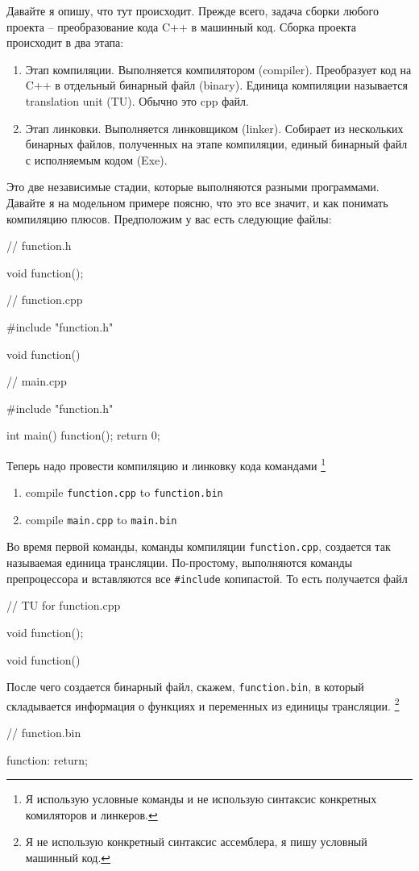 Давайте я опишу, что тут происходит.
Прежде всего, задача сборки любого проекта -- преобразование кода C++ в машинный код.
Сборка проекта происходит в два этапа:
\begin{enumerate}
\item Этап компиляции.
Выполняется компилятором (compiler).
Преобразует код на C++ в отдельный бинарный файл (binary).
Единица компиляции называется translation unit (TU).
Обычно это cpp файл.

\item Этап линковки.
Выполняется линковщиком (linker).
Собирает из нескольких бинарных файлов, полученных на этапе компиляции, единый бинарный файл с исполняемым кодом (Exe).
\end{enumerate}

Это две независимые стадии, которые выполняются разными программами.
Давайте я на модельном примере поясню, что это все значит, и как понимать компиляцию плюсов.
Предположим у вас есть следующие файлы:
\begin{cppcode}
// function.h

void function();

// function.cpp

#include "function.h"

void function() {
}

// main.cpp

#include "function.h"

int main() {
function();
return 0;
}
\end{cppcode}
Теперь надо провести компиляцию и линковку кода командами%
\footnote{Я использую условные команды и не использую синтаксис конкретных комиляторов и линкеров.}
\begin{enumerate}
\item compile \verb"function.cpp" to \verb"function.bin"

\item compile \verb"main.cpp" to \verb"main.bin"
\end{enumerate}
Во время первой команды, команды компиляции \verb"function.cpp", создается так называемая единица трансляции.
По-простому, выполняются команды препроцессора и вставляются все \verb"#include" копипастой.
То есть получается файл
\begin{cppcode}
// TU for function.cpp

void function();

void function() {
}
\end{cppcode}
После чего создается бинарный файл, скажем, \verb"function.bin", в который складывается информация о функциях и переменных из единицы трансляции.%
\footnote{Я не использую конкретный синтаксис ассемблера, я пишу условный машинный код.}
\begin{cppcode}
// function.bin

function:
  return;
\end{cppcode}

